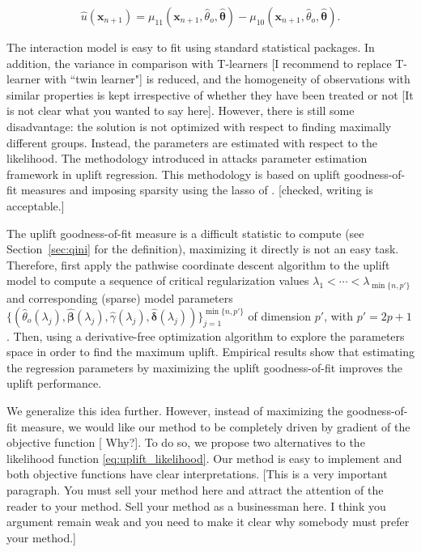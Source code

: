 \documentclass{article}
\def\x{\mathbf x}
\def \vahid {\color{magenta}}
\begin{document}
$$ \hat{u}(\mathbf{x}_{n+1}) = \mu_{11}(\x_{n+1}, \hat{\theta}_o, \hat{\boldsymbol{\theta}}) - \mu_{10}(\x_{n+1}, \hat{\theta}_o, \hat{\boldsymbol{\theta}}).$$

The interaction model is easy to fit using standard statistical packages. In addition, the variance in comparison with T-learners {\vahid [I recommend to replace T-learner with ``twin learner"]} is reduced, and the homogeneity of observations with similar properties is kept irrespective of whether they have been treated or not {\vahid [It is not clear what you wanted to say here]}. However, there is still some disadvantage: the solution is not optimized with respect to finding maximally different groups. Instead, the parameters are estimated with respect to the likelihood. The methodology introduced in \cite{belba2019qbased} attacks parameter estimation framework in uplift regression. This methodology is based on uplift goodness-of-fit measures and imposing sparsity using the lasso of \cite{Tibshirani_lasso_1996}. {\vahid [checked, writing is acceptable.]} 

The uplift goodness-of-fit measure is a difficult statistic to compute (see Section~\ref{sec:qini} for the definition), maximizing it directly is not an easy task. Therefore, \cite{belba2019qbased} first apply the pathwise coordinate descent algorithm \citep{friedman2007pathwise} to the uplift model to compute  a sequence of critical regularization values $\lambda_1 < \cdots < \lambda_{\min\{n,p'\}}$ and corresponding (sparse) model parameters $\{ (\hat \theta_o(\lambda_j), \boldsymbol{\hat\beta}(\lambda_j), \hat\gamma(\lambda_j), \boldsymbol{\hat\delta}(\lambda_j)) \}_{j=1}^{\min\{n,p'\}}$ of dimension $p'$, with $p'=2p+1$. Then, using a derivative-free optimization algorithm to explore the parameters space in order to find the maximum uplift. Empirical results show that estimating the regression parameters by maximizing the uplift goodness-of-fit improves the uplift performance. 

We generalize this idea further. However, instead of maximizing the goodness-of-fit measure, we would like our method to be completely driven by gradient of the objective function {\vahid [ Why?]}. To do so, we propose two alternatives to the likelihood function \eqref{eq:uplift_likelihood}. Our method is easy to implement and both objective functions have clear interpretations. {\vahid [This is a very important paragraph. You must sell your method here and attract the attention of the reader to your method. Sell your method as a businessman here. I think you argument remain weak and you need to make it clear why somebody must prefer your method.]}
\end{document}
